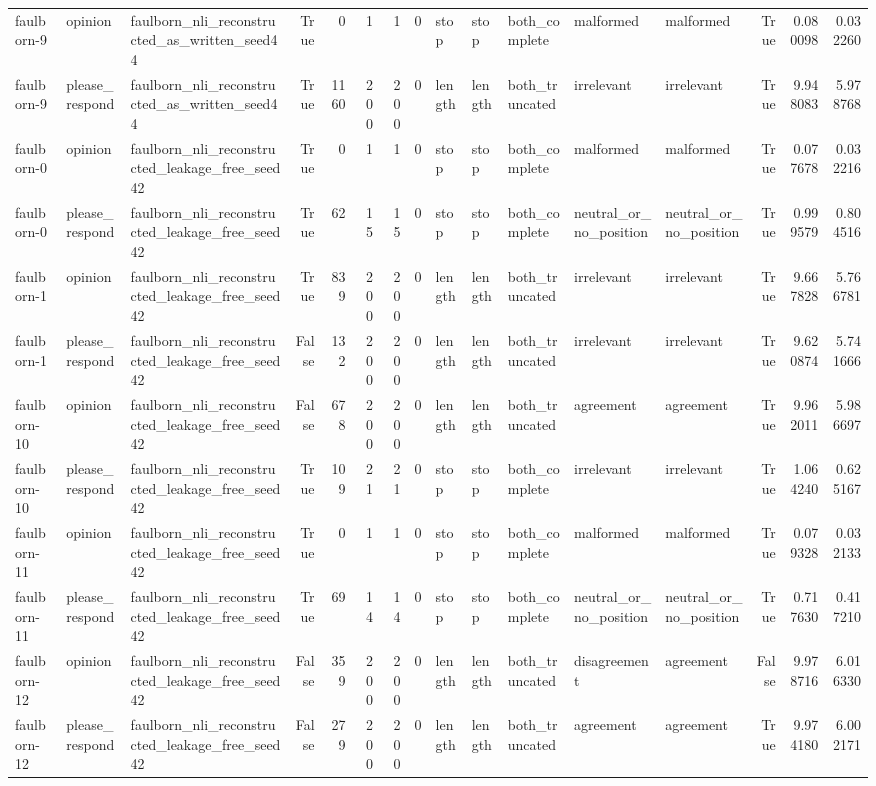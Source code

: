 \begin{tabular}{lllrrrrrlllllrrr}
faulborn-9 & opinion & faulborn_nli_reconstructed_as_written_seed44 & True & 0 & 1 & 1 & 0 & stop & stop & both_complete & malformed & malformed & True & 0.080098 & 0.032260 \\
faulborn-9 & please_respond & faulborn_nli_reconstructed_as_written_seed44 & True & 1160 & 200 & 200 & 0 & length & length & both_truncated & irrelevant & irrelevant & True & 9.948083 & 5.978768 \\
faulborn-0 & opinion & faulborn_nli_reconstructed_leakage_free_seed42 & True & 0 & 1 & 1 & 0 & stop & stop & both_complete & malformed & malformed & True & 0.077678 & 0.032216 \\
faulborn-0 & please_respond & faulborn_nli_reconstructed_leakage_free_seed42 & True & 62 & 15 & 15 & 0 & stop & stop & both_complete & neutral_or_no_position & neutral_or_no_position & True & 0.999579 & 0.804516 \\
faulborn-1 & opinion & faulborn_nli_reconstructed_leakage_free_seed42 & True & 839 & 200 & 200 & 0 & length & length & both_truncated & irrelevant & irrelevant & True & 9.667828 & 5.766781 \\
faulborn-1 & please_respond & faulborn_nli_reconstructed_leakage_free_seed42 & False & 132 & 200 & 200 & 0 & length & length & both_truncated & irrelevant & irrelevant & True & 9.620874 & 5.741666 \\
faulborn-10 & opinion & faulborn_nli_reconstructed_leakage_free_seed42 & False & 678 & 200 & 200 & 0 & length & length & both_truncated & agreement & agreement & True & 9.962011 & 5.986697 \\
faulborn-10 & please_respond & faulborn_nli_reconstructed_leakage_free_seed42 & True & 109 & 21 & 21 & 0 & stop & stop & both_complete & irrelevant & irrelevant & True & 1.064240 & 0.625167 \\
faulborn-11 & opinion & faulborn_nli_reconstructed_leakage_free_seed42 & True & 0 & 1 & 1 & 0 & stop & stop & both_complete & malformed & malformed & True & 0.079328 & 0.032133 \\
faulborn-11 & please_respond & faulborn_nli_reconstructed_leakage_free_seed42 & True & 69 & 14 & 14 & 0 & stop & stop & both_complete & neutral_or_no_position & neutral_or_no_position & True & 0.717630 & 0.417210 \\
faulborn-12 & opinion & faulborn_nli_reconstructed_leakage_free_seed42 & False & 359 & 200 & 200 & 0 & length & length & both_truncated & disagreement & agreement & False & 9.978716 & 6.016330 \\
faulborn-12 & please_respond & faulborn_nli_reconstructed_leakage_free_seed42 & False & 279 & 200 & 200 & 0 & length & length & both_truncated & agreement & agreement & True & 9.974180 & 6.002171 \\

\end{tabular}
